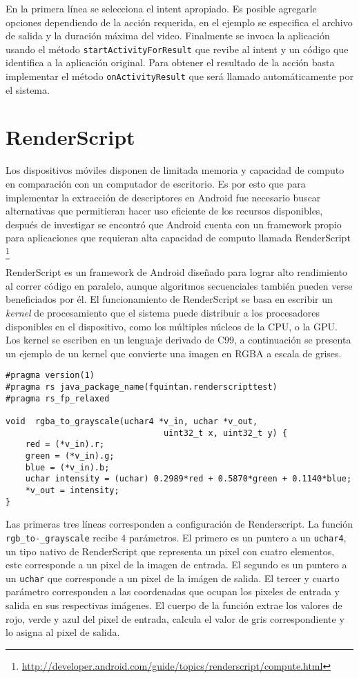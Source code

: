 En la primera línea se selecciona el intent apropiado. Es posible agregarle opciones dependiendo de la acción requerida, en el ejemplo se especifica el archivo de salida y la duración máxima del video. Finalmente se invoca la aplicación usando el método \texttt{startActivityForResult} que revibe al intent y un código que identifica a la aplicación original. Para obtener el resultado de la acción basta implementar el método \texttt{onActivityResult} que será llamado automáticamente por el sistema.  

\section{RenderScript}\label{renderscript}
Los dispositivos móviles disponen de limitada memoria y capacidad de computo en comparación con un computador de escritorio. Es por esto que para implementar la extracción de descriptores en Android fue necesario buscar alternativas que permitieran hacer uso eficiente de los recursos disponibles, después de investigar se encontró que Android cuenta con un framework propio para aplicaciones que requieran alta capacidad de computo llamada RenderScript \footnote{\url{http://developer.android.com/guide/topics/renderscript/compute.html}}

RenderScript es un framework de Android diseñado para lograr alto rendimiento al correr código en paralelo, aunque algoritmos secuenciales también pueden verse beneficiados por él. El funcionamiento de RenderScript se basa en escribir un \emph{kernel} de procesamiento que el sistema puede distribuir a los procesadores disponibles en el dispositivo, como los múltiples núcleos de la CPU, o la GPU. 
Los kernel se escriben en un lenguaje derivado de C99, a continuación se presenta un ejemplo de un kernel que convierte una imagen en RGBA a escala de grises.

\begin{lstlisting}[basicstyle=\small,frame=bt]
#pragma version(1)
#pragma rs java_package_name(fquintan.renderscripttest)
#pragma rs_fp_relaxed

void  rgba_to_grayscale(uchar4 *v_in, uchar *v_out,
                                uint32_t x, uint32_t y) {
    red = (*v_in).r;
    green = (*v_in).g;
    blue = (*v_in).b;
    uchar intensity = (uchar) 0.2989*red + 0.5870*green + 0.1140*blue;
    *v_out = intensity;
}
\end{lstlisting}

Las primeras tres líneas corresponden a configuración de Renderscript. La función \texttt{\justify rgb\_to-\_grayscale} recibe 4 parámetros. El primero es un puntero a un \texttt{uchar4}, un tipo nativo de RenderScript que representa un pixel con cuatro elementos, este corresponde a un pixel de la imagen de entrada. El segundo es un puntero a un \texttt{uchar} que corresponde a un pixel de la imágen de salida. El tercer y cuarto parámetro corresponden a las coordenadas que ocupan los pixeles de entrada y salida en sus respectivas imágenes. El cuerpo de la función extrae los valores de rojo, verde y azul del pixel de entrada, calcula el valor de gris correspondiente y lo asigna al pixel de salida.

